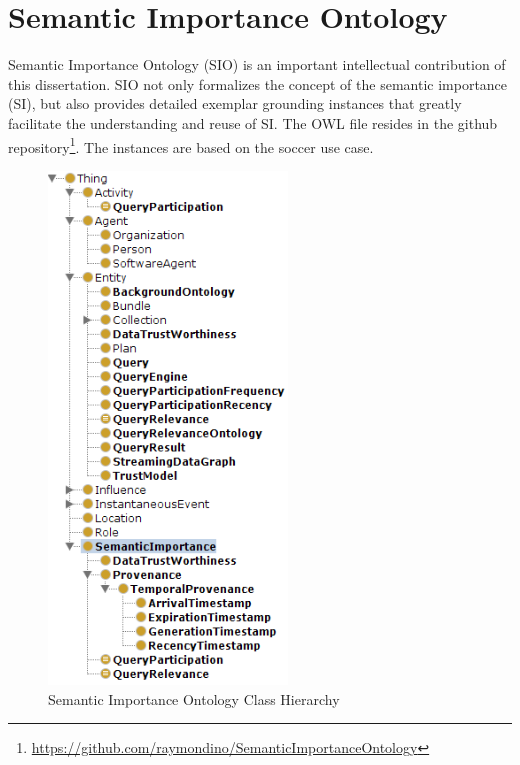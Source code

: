  
\appendix    %

\chapter{Semantic Importance Ontology}
Semantic Importance Ontology (SIO) is an important intellectual contribution of this dissertation. 
SIO not only formalizes the concept of the semantic importance (SI), but also provides detailed exemplar grounding instances that greatly facilitate the understanding and reuse of SI. 
The OWL file resides in the github repository\footnote{\url{https://github.com/raymondino/SemanticImportanceOntology}}.
The instances are based on the soccer use case.

\begin{figure}[!htbp]
    \centering
    \includegraphics[width=2.5in]{img/app-sio.png}
    \caption{Semantic Importance Ontology Class Hierarchy}
    \label{fig:app-sio}
\end{figure}

